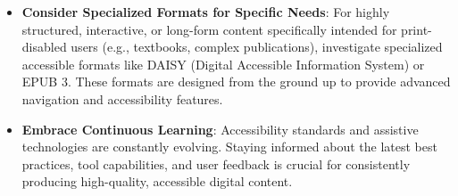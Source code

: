 \begin{itemize}[noitemsep,topsep=0pt]
    \item \textbf{Consider Specialized Formats for Specific Needs}: For highly structured, interactive, or long-form content specifically intended for print-disabled users (e.g., textbooks, complex publications), investigate specialized accessible formats like DAISY (Digital Accessible Information System) or EPUB 3. These formats are designed from the ground up to provide advanced navigation and accessibility features.
    \item \textbf{Embrace Continuous Learning}: Accessibility standards and assistive technologies are constantly evolving. Staying informed about the latest best practices, tool capabilities, and user feedback is crucial for consistently producing high-quality, accessible digital content.
\end{itemize}
